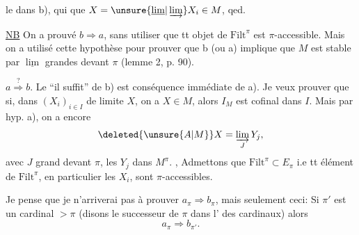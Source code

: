 le  dans b), qui   que $X=\unsure{\underline{\lim}|\varinjlim}X_i\in M$, qed.

\uline{NB} On a prouvé $b\Rightarrow a$, sans utiliser  que tt objet de $\mathrm{Filt}^{\pi}$ est $\pi$-accessible. Mais on a utilisé cette hypothèse pour prouver que b  (ou a) implique que $M$ est stable par $\underline{\lim}$ grandes devant $\pi$ (lemme 2, p. 90).

$a\overset{?}{\Longrightarrow}b$. Le ``il suffit'' de b) est conséquence immédiate de a). Je veux prouver que si, dans     $(X_i)_{i\in I}$ de limite $X$, on a $X\in M$, alors $I_M$ est cofinal dans $I$. Mais par hyp. a), on a encore
\[
\deleted{\unsure{A|M}}X=\varinjlim_JY_j,
\]
avec $J$ grand devant $\pi$, les $Y_j$ dans $M^{\pi}$. , Admettons que $\mathrm{Filt}^{\pi}\subset E_\pi$ i.e tt élément de $\mathrm{Filt}^{\pi}$, en particulier les $X_i$, sont  $\pi$-accessibles.

Je pense que je n'arriverai pas à prouver $a_\pi\Rightarrow b_\pi$, mais seulement ceci: Si $\pi'$ est un cardinal $>\pi$ (disons le successeur de $\pi$  dans l'  des cardinaux) alors
\[
a_\pi\Longrightarrow b_{\pi'}.
\]
